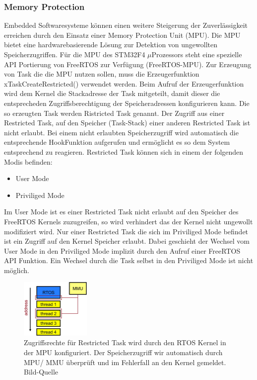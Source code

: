 \subsubsection{Memory Protection}
\label{sec:Memory Protection}
Embedded Softwaresysteme können einen weitere Steigerung der Zuverlässigkeit erreichen durch den Einsatz einer Memory Protection Unit (MPU). Die MPU bietet eine hardwarebasierende Lösung zur Detektion von ungewollten Speicherzugriffen. Für die MPU des STM32F4 $\mu$\-Pro\-zesso\-rs steht eine spezielle API Portierung von FreeRTOS zur Verfügung (FreeRTOS-MPU). Zur Erzeugung von Task die die MPU nutzen sollen, muss die Erzeugerfunktion xTaskCreateRestricted() verwendet werden. Beim Aufruf der Erzeugerfunktion wird dem Kernel die Stackadresse der Task mitgeteilt, damit dieser die entsprecheden Zugriffsberechtigung der Speicheradressen konfigurieren kann. Die so erzeugten Task werden Ristricted Task genannt. Der Zugriff aus einer Restricted Task, auf den Speicher (Task-Stack) einer anderen Restricted Task ist nicht erlaubt. Bei einem nicht erlaubten Speicherzugriff wird automatisch die entsprechende HookFunktion aufgerufen und ermöglicht es so dem System entsprechend zu reagieren. Restricted Task können sich in einem der folgenden Modis befinden:
\begin{itemize}
	\item User Mode
	\item Priviliged Mode 
\end{itemize}
Im User Mode ist es einer Restricted Task nicht erlaubt auf den Speicher des FreeRTOS Kernels zuzugreifen, so wird verhindert das der Kernel nicht ungewollt modifiziert wird. Nur einer Restricted Task die sich im Priviliged Mode befindet ist ein Zugriff auf den Kernel Speicher erlaubt. Dabei geschieht der Wechsel vom User Mode in den Priviliged Mode implizit durch den Aufruf einer FreeRTOS API Funktion. Ein Wechsel durch die Task selbst in den Priviliged Mode ist nicht möglich.
\begin{figure}[htb]
	\centering
		\includegraphics[width=0.3\textwidth]{Pictures/EmbeddedCom/addressSpaceMMU}
	\caption{Zugriffsrechte für Restricted Task wird durch den RTOS Kernel in der MPU konfiguriert. Der Speicherzugriff wir automatisch durch MPU/ MMU überprüft und im Fehlerfall an den Kernel gemeldet. Bild-Quelle~\protect{}}
	\label{fig:AddressSpaceMMU}
\end{figure} 
